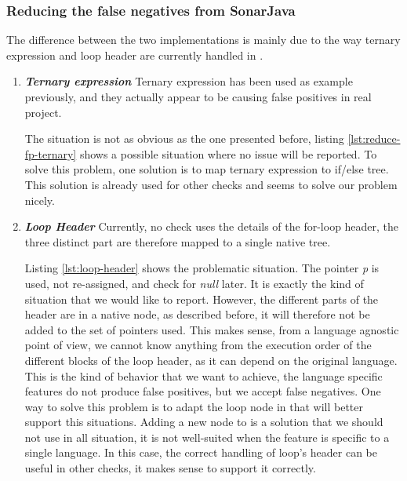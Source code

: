 \subsubsection{Reducing the false negatives from SonarJava}
\label{subsec:reducing_false_positive_sonarjava}

The difference between the two implementations is mainly due to the way ternary expression and loop header are currently handled in \slang{}.
\begin{enumerate}
	\item \textbf{\textit{Ternary expression}} \newline 
	\label{subsubsec:reducing_false_positive_ternary}
	Ternary expression has been used as example previously, and they actually appear to be causing false positives in real project.
	
	
	
	The situation is not as obvious as the one presented before, listing \ref{lst:reduce-fp-ternary} shows a possible situation where no issue will be reported. 
	To solve this problem, one solution is to map ternary expression to if/else tree.
	This solution is already used for other checks and seems to solve our problem nicely.
	
	\item \textbf{\textit{Loop Header}} \newline 	
	\label{subsubsec:loop_header}
	Currently, no check uses the details of the for-loop header, the three distinct part are therefore mapped to a single native tree. 
	
	
	
	Listing \ref{lst:loop-header} shows the problematic situation. 
	The pointer \emph{p} is used, not re-assigned, and check for \emph{null} later. 
	It is exactly the kind of situation that we would like to report. 
	However, the different parts of the header are in a native node, as described before, it will therefore not be added to the set of pointers used.
	This makes sense, from a language agnostic point of view, we cannot know anything from the execution order of the different blocks of the loop header, as it can depend on the original language.
	This is the kind of behavior that we want to achieve, the language specific features do not produce false positives, but we accept false negatives.
	One way to solve this problem is to adapt the loop node in \slang{} that will better support this situations.
	Adding a new node to \slang{} is a solution that we should not use in all situation, it is not well-suited when the feature is specific to a single language.
	In this case, the correct handling of loop's header can be useful in other checks, it makes sense to support it correctly.
\end{enumerate}

